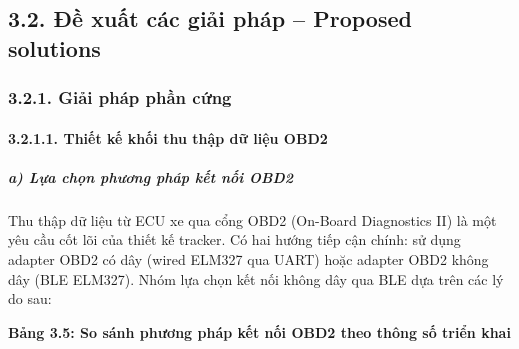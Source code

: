 \documentclass[13pt,a4paper]{extarticle}
\renewcommand{\\}{\thesislongtableorignewline\hline}%
\newcommand{\thesistabletitle}[1]{%
  \begin{center}\textbf{#1}\end{center}%
}
\begin{document}
\subsection{3.2. Đề xuất các giải pháp -- Proposed
solutions}\label{32-ux111ux1ec1-xuux1ea5t-cuxe1c-giux1ea3i-phuxe1p--proposed-solutions}

\subsubsection{3.2.1. Giải pháp phần
cứng}\label{321-giux1ea3i-phuxe1p-phux1ea7n-cux1ee9ng}

\paragraph{3.2.1.1. Thiết kế khối thu thập dữ liệu
OBD2}\label{3211-thiux1ebft-kux1ebf-muxf4-ux111un-thu-thux1eadp-dux1eef-liux1ec7u-obd2}

\subparagraph{a) Lựa chọn phương pháp kết nối
OBD2}\label{a-lux1ef1a-chux1ecdn-phux1b0ux1a1ng-phuxe1p-kux1ebft-nux1ed1i-obd2}

Thu thập dữ liệu từ ECU xe qua cổng OBD2 (On-Board Diagnostics II) là
một yêu cầu cốt lõi của thiết kế tracker. Có hai hướng tiếp cận chính:
sử dụng adapter OBD2 có dây (wired ELM327 qua UART) hoặc adapter OBD2
không dây (BLE ELM327). Nhóm lựa chọn kết nối không dây qua BLE dựa trên
các lý do sau:

\thesistabletitle{Bảng 3.5: So sánh phương pháp kết nối OBD2 theo thông số triển
khai}
\end{document}
